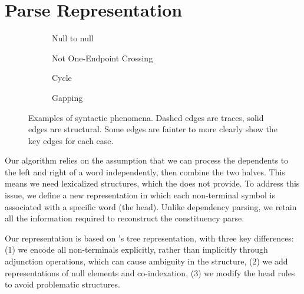 \section{Parse Representation}

\begin{figure}
\hfill
\begin{subfigure}[b]{0.39\textwidth}
  \centering
  \scalebox{0.8}{}
  \caption{\label{fig:null-null}
    Null to null
  }
\end{subfigure}
\hfill
\begin{subfigure}[b]{0.5\textwidth}
  \centering
  \scalebox{0.8}{}
  \caption{\label{fig:not-1ec}
    Not One-Endpoint Crossing
  }
\end{subfigure}
\hfill
\strut

\vspace{5mm}
\hfill
\begin{subfigure}[b]{0.33\textwidth}
  \centering
  \scalebox{0.8}{}
  \caption{\label{fig:cycle}
    Cycle
  }
\end{subfigure}
\hfill
\begin{subfigure}[b]{0.46\textwidth}
  \centering
  \scalebox{0.8}{}
  \caption{\label{fig:gapping}
    Gapping
  }
\end{subfigure}
\hfill
\strut
\caption[Examples of graph structured syntactic phenomena.]{
Examples of syntactic phenomena.
Dashed edges are traces, solid edges are structural.
Some edges are fainter to more clearly show the key edges for each case.
}
\end{figure}

Our algorithm relies on the assumption that we can process the dependents to the left and right of a word independently, then combine the two halves.
This means we need lexicalized structures, which the \ptb does not provide.
To address this issue, we define a new representation in which each non-terminal symbol is associated with a specific word (the head).
Unlike dependency parsing, we retain all the information required to reconstruct the constituency parse.

Our representation is based on \textcite{cck}'s tree representation, with three key differences:
(1) we encode all non-terminals explicitly, rather than implicitly through adjunction operations, which can cause ambiguity in the structure,
(2) we add representations of null elements and co-indexation,
(3) we modify the head rules to avoid problematic structures.

